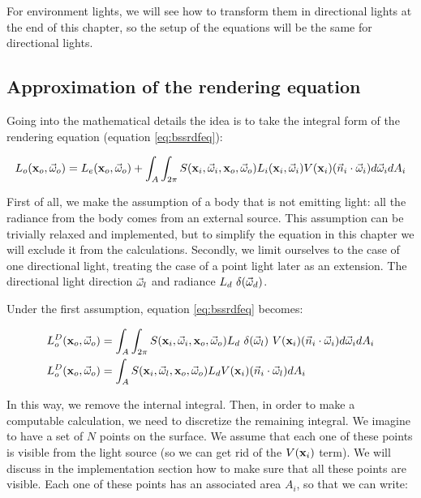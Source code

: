 For environment lights, we will see how to transform them in directional lights at the end of this chapter, so the setup of the equations will be the same for directional lights.

\subsection{Approximation of the rendering equation}

Going into the mathematical details the idea is to take the integral form of the rendering equation (equation \ref{eq:bssrdfeq}):

\begin{equation*}
L_o(\mathbf{x}_o,\vec{\omega}_o) = L_e(\mathbf{x}_o,\vec{\omega}_o) + \int_A \int_{2\pi} S(\mathbf{x}_i, \vec{\omega}_i, \mathbf{x}_o, \vec{\omega}_o) L_i(\mathbf{x}_i,\vec{\omega}_i) V(\mathbf{x}_i) (\vec{n}_i \cdot \vec{\omega}_i) d\vec{\omega}_i d A_i
\end{equation*}

First of all, we make the assumption of a body that is not emitting light: all the radiance from the body comes from an external source. This assumption can be trivially relaxed and implemented, but to simplify the equation in this chapter we will exclude it from the calculations. Secondly, we limit ourselves to the case of one directional light, treating the case of a point light later as an extension. The directional light direction $\vec{\omega}_l$ and radiance $L_d \ \delta(\vec{\omega}_d)$.

Under the first assumption, equation \ref{eq:bssrdfeq} becomes:

\begin{equation*}
\begin{split}
L_o^D(\mathbf{x}_o,\vec{\omega}_o) &= \int_A \int_{2\pi} S(\mathbf{x}_i, \vec{\omega}_i, \mathbf{x}_o, \vec{\omega}_o) L_d \ \delta(\vec{\omega}_l)\ V(\mathbf{x}_i) (\vec{n}_i \cdot \vec{\omega}_i) d\vec{\omega}_i d A_i \\
L_o^D(\mathbf{x}_o,\vec{\omega}_o) &= \int_A S(\mathbf{x}_i, \vec{\omega}_l, \mathbf{x}_o, \vec{\omega}_o) L_d  V(\mathbf{x}_i) (\vec{n}_i \cdot \vec{\omega}_l) d A_i 
\end{split}
\end{equation*}

In this way, we remove the internal integral. Then, in order to make a computable calculation, we need to discretize the remaining integral. We imagine to have a set of $N$ points on the surface. We assume that each one of these points is visible from the light source (so we can get rid of the $V(\mathbf{x}_i)$ term). We will discuss in the implementation section how to make sure that all these points are visible. Each one of these points has an associated area $A_i$, so that we can write:

